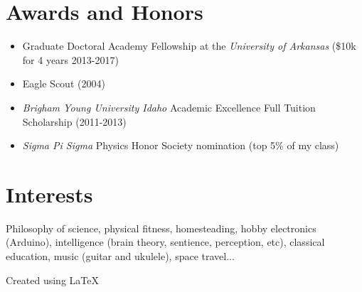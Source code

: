 \documentclass[10pt]{article}
\begin{document}
\section*{Awards and Honors}
\begin{itemize}
    \itemsep-0.5em
    \item Graduate Doctoral Academy Fellowship at the {\it University of Arkansas}
        (\$10k for 4 years 2013-2017)
    \item Eagle Scout (2004)
    \item {\it Brigham Young University Idaho} Academic Excellence Full Tuition Scholarship (2011-2013)
    \item {\it Sigma Pi Sigma} Physics Honor Society nomination (top 5\% of my class)
\end{itemize}

\section*{Interests}
Philosophy of science, physical fitness, homesteading, hobby electronics (Arduino),
intelligence (brain theory, sentience, perception, etc), classical education, music
(guitar and ukulele), space travel...

{
    \vspace{20pt}
    \scriptsize\hfill Created using \LaTeX
}
\end{document}
